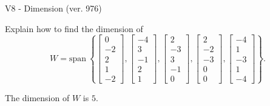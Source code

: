 \begin{exercise}
  \begin{exerciseTitle}V8 - Dimension (ver. 976)\end{exerciseTitle}
  \begin{exerciseStatement}
    Explain how to find the dimension of 
\[W=\mathrm{span}\ \left\{\left[\begin{array}{r}
0 \\
-2 \\
2 \\
1 \\
-2
\end{array}\right] , \left[\begin{array}{r}
-4 \\
3 \\
-1 \\
2 \\
1
\end{array}\right] , \left[\begin{array}{r}
2 \\
-3 \\
3 \\
-1 \\
0
\end{array}\right] , \left[\begin{array}{r}
2 \\
-2 \\
-3 \\
0 \\
0
\end{array}\right] , \left[\begin{array}{r}
-4 \\
1 \\
-3 \\
1 \\
-4
\end{array}\right]\right\}.\]



  \end{exerciseStatement}
  \begin{exerciseAnswer}
   The dimension of \(W\) is  \(5\).
  


  \end{exerciseAnswer}
\end{exercise}